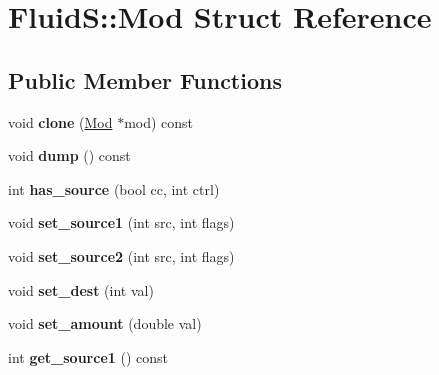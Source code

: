 \hypertarget{struct_fluid_s_1_1_mod}{}\section{FluidS\+:\+:Mod Struct Reference}
\label{struct_fluid_s_1_1_mod}
\subsection*{Public Member Functions}
\begin{DoxyCompactItemize}
\item 
\mbox{\label{struct_fluid_s_1_1_mod_a7e1316196c59dec6d257da925d73bfd7}} 
void {\bfseries clone} (\hyperlink{struct_fluid_s_1_1_mod}{Mod} $\ast$mod) const
\item 
\mbox{\label{struct_fluid_s_1_1_mod_a5e0b4431c4fdaa01401bd7f3226e8956}} 
void {\bfseries dump} () const
\item 
\mbox{\label{struct_fluid_s_1_1_mod_aac427e9a7f13e327399ac98ac9c3fb39}} 
int {\bfseries has\+\_\+source} (bool cc, int ctrl)
\item 
\mbox{\label{struct_fluid_s_1_1_mod_a48a4c50cc1e6a27fc2784a63f8c15ab9}} 
void {\bfseries set\+\_\+source1} (int src, int flags)
\item 
\mbox{\label{struct_fluid_s_1_1_mod_a96e037ad0c71a21f51849178c982eabb}} 
void {\bfseries set\+\_\+source2} (int src, int flags)
\item 
\mbox{\label{struct_fluid_s_1_1_mod_a15006950722868ffae4bf988edaaa2c3}} 
void {\bfseries set\+\_\+dest} (int val)
\item 
\mbox{\label{struct_fluid_s_1_1_mod_a36dc163b56fd24b8ef88db7b8f406c67}} 
void {\bfseries set\+\_\+amount} (double val)
\item 
\mbox{\label{struct_fluid_s_1_1_mod_a776d6eefa09874d08cc256967ca78727}} 
int {\bfseries get\+\_\+source1} () const
\item 
\mbox{\label{struct_fluid_s_1_1_mod_a4fb2dab33ee2a26bd78ddded452e9e9f}} 

\end{DoxyCompactItemize}
